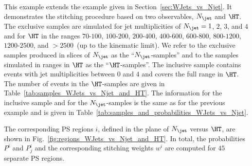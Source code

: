 This example extends the example given in Section~\ref{sec:WJets_vs_Njet}.
It demonstrates the stitching procedure based on two observables, $N_{\jet}$ and $\HT$.
The exclusive samples are simulated for jet multiplicities of $N_{\jet} = 1$, $2$, $3$, and $4$ 
and for $\HT$ in the ranges $70$-$100$, $100$-$200$, $200$-$400$, $400$-$600$, $600$-$800$, $800$-$1200$, $1200$-$2500$, and $> 2500$~\GeV (up to the kinematic limit).
We refer to the exclusive samples produced in slices of $N_{\jet}$ as the ``$N_{\jet}$-samples''
and to the samples simulated in ranges in $\HT$ as the ``$\HT$-samples''.
The inclusive sample contains events with jet multiplicities between $0$ and $4$ and covers the full range in $\HT$.
The number of events in the $\HT$-samples are given in Table~\ref{tab:samples_WJets_vs_Njet_and_HT}.
The information for the inclusive sample and for the $N_{\jet}$-samples is the same as for the previous example
and is given in Table~\ref{tab:samples_and_probabilities_WJets_vs_Njet}.

The corresponding PS regions $i$, defined in the plane of $N_{\jet}$ versus $\HT$, are shown in Fig.~\ref{fig:regions_WJets_vs_Njet_and_HT}.
In total, the probabilities $P^{i}$ and $P_{j}^{i}$ and the corresponding stitching weights $w^{i}$ are computed for $45$ separate PS regions.

